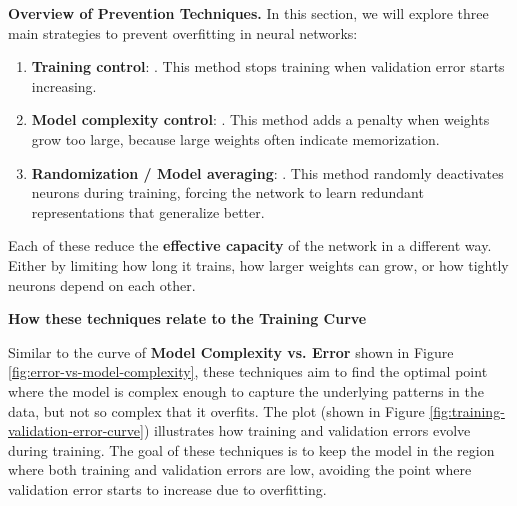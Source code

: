 \highspace
\textcolor{Green3}{ \textbf{Overview of Prevention Techniques.}} In this section, we will explore three main strategies to prevent overfitting in neural networks:
\begin{enumerate}
    \item \textbf{Training control}: . This method stops training when validation error starts increasing.
    \item \textbf{Model complexity control}: . This method adds a penalty when weights grow too large, because large weights often indicate memorization.
    \item \textbf{Randomization / Model averaging}: . This method randomly deactivates neurons during training, forcing the network to learn redundant representations that generalize better.
\end{enumerate}
Each of these reduce the \textbf{effective capacity} of the network in a different way. Either by limiting how long it trains, how larger weights can grow, or how tightly neurons depend on each other.

\newpage

\begin{flushleft}
    \textcolor{Green3}{ \textbf{How these techniques relate to the Training Curve}}
\end{flushleft}
Similar to the curve of \textbf{Model Complexity vs. Error} shown in Figure \ref{fig:error-vs-model-complexity}, these techniques aim to find the optimal point where the model is complex enough to capture the underlying patterns in the data, but not so complex that it overfits. The  plot (shown in Figure \ref{fig:training-validation-error-curve}) illustrates how training and validation errors evolve during training. The goal of these techniques is to keep the model in the region where both training and validation errors are low, avoiding the point where validation error starts to increase due to overfitting.

